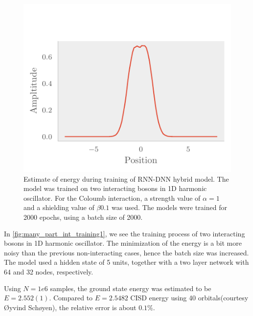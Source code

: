 \begin{figure}[H]
	\includegraphics[]{figures/many_part_int_training1.pdf}
	\caption{Estimate of energy during training of RNN-DNN hybrid model. The model was trained on two interacting bosons in 1D harmonic oscillator. For the Coloumb interaction, a strength value of $\alpha = 1$ and a shielding value of $\beta 0.1$ was used. The models were trained for 2000 epochs, using a batch size of 2000.}
	\label{fig:many_part_int_training1}
\end{figure}

In \autoref{fig:many_part_int_training1}, we see the training process of two interacting bosons in 1D harmonic oscillator. The minimization of the energy is a bit more noisy than the previous non-interacting cases, hence the batch size was increased. The model used a hidden state of 5 units, together with a two layer network with 64 and 32 nodes, respectively.

Using $N=1e6$ samples, the ground state energy was estimated to be $E = 2.552(1)$. Compared to $E = 2.5482$ CISD energy using 40 orbitals(courtesy Øyvind Schøyen), the relative error is about $0.1\%$.

